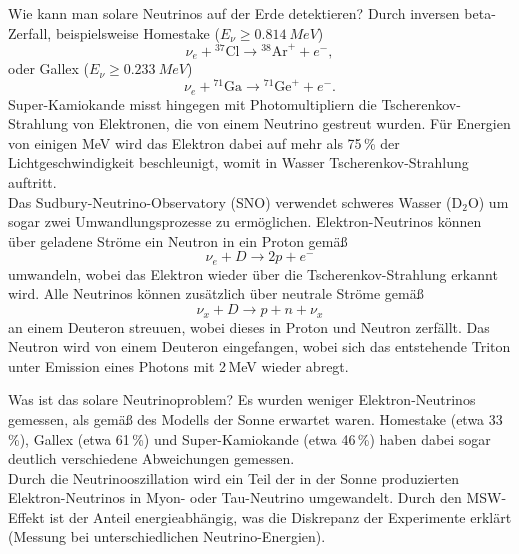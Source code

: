 \begin{fquestion}{Wie kann man solare Neutrinos auf der Erde detektieren?}
    Durch inversen beta-Zerfall, beispielsweise Homestake ($E_\nu \ge \SI{0.814}{MeV}$)
    $$\nu_e + {}^{37}\mathrm{Cl} \rightarrow {}^{38}\mathrm{Ar}^+ + e^-,$$
    oder Gallex ($E_\nu \ge \SI{0.233}{MeV}$)
    $$\nu_e + {}^{71}\mathrm{Ga} \rightarrow {}^{71}\mathrm{Ge}^+ + e^-.$$
    Super-Kamiokande misst hingegen mit Photomultipliern die Tscherenkov-Strahlung von Elektronen, die von einem Neutrino gestreut wurden.
    Für Energien von einigen MeV wird das Elektron dabei auf mehr als 75\,\% der Lichtgeschwindigkeit beschleunigt, womit in Wasser Tscherenkov-Strahlung auftritt.
    \\
    Das Sudbury-Neutrino-Observatory (SNO) verwendet schweres Wasser ($\mathrm{D}_2$O) um sogar zwei Umwandlungsprozesse zu ermöglichen.
    Elektron-Neutrinos können über geladene Ströme ein Neutron in ein Proton gemäß
    $$\nu_e + D \rightarrow 2p + e^-$$
    umwandeln, wobei das Elektron wieder über die Tscherenkov-Strahlung erkannt wird.
    Alle Neutrinos können zusätzlich über neutrale Ströme gemäß
    $$\nu_x + D \rightarrow p + n + \nu_x$$
    an einem Deuteron streuuen, wobei dieses in Proton und Neutron zerfällt.
    Das Neutron wird von einem Deuteron eingefangen, wobei sich das entstehende Triton unter Emission eines Photons mit 2\,MeV wieder abregt.
\end{fquestion}

\begin{fquestion}{Was ist das solare Neutrinoproblem?}
    Es wurden weniger Elektron-Neutrinos gemessen, als gemäß des Modells der Sonne erwartet waren. 
    Homestake (etwa 33\,\%), Gallex (etwa 61\,\%) und Super-Kamiokande (etwa 46\,\%) haben dabei sogar deutlich verschiedene Abweichungen gemessen.
    \\
    Durch die Neutrinooszillation wird ein Teil der in der Sonne produzierten Elektron-Neutrinos in Myon- oder Tau-Neutrino umgewandelt.
    Durch den MSW-Effekt ist der Anteil energieabhängig, was die Diskrepanz der Experimente erklärt (Messung bei unterschiedlichen Neutrino-Energien).
\end{fquestion}


